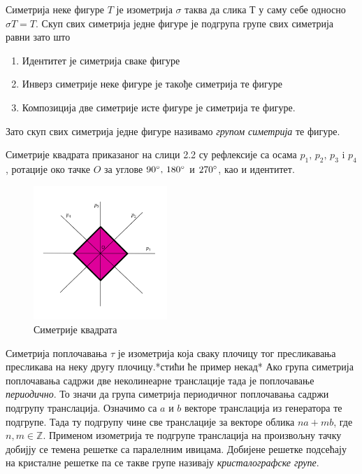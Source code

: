 \documentclass[12pt]{report}
\begin{document}
Симетрија неке фигуре $T$ је изометрија $\sigma$ таква да слика $Т$ у саму себе односно $\sigma T = T$. Скуп свих симетрија једне фигуре је подгрупа групе свих симетрија равни зато што
\begin{enumerate}
    \item Идентитет је симетрија сваке фигуре
    \item Инверз симетрије неке фигуре је такође симетрија те фигуре
    \item Композиција две симетрије исте фигуре је симетрија те фигуре.
\end{enumerate}

Зато скуп свих симетрија једне фигуре називамо \emph{групом симетрија} те фигуре.
\newline



Симетрије квадрата приказаног на слици 2.2 су рефлексије са осама $p_1,\, p_2,\, p_3$ i $p_4$, ротације око тачке $O$ за углове $90\degree,\, 180\degree$ и $ 270\degree$, као и идентитет.
 
 
 
\begin{figure}[H]
\centering
\includegraphics[width=0.45\textwidth]{Simetrije_kocke.png}
\caption{Симетрије квадрата}

\end{figure}





Симетрија поплочавања $\tau$ је изометрија која сваку плочицу тог пресликавања пресликава на неку другу плочицу.*стићи ће пример некад*
Ако група симетрија поплочавања садржи две неколинеарне транслације тада је поплочавање \emph{периодично}. То значи да група симетрија периодичног поплочавања садржи подгрупу транслација. Означимо са $a$ и $b$ векторе транслација из генератора те подгрупе. Тада ту подгрупу чине све транслације за  векторе облика $na + mb$, где $n,m \in \mathbb{Z} $. Применом изометрија те подгрупе транслација на произвољну тачку добијју се темена решетке са паралелним ивицама. Добијене решетке подсећају на кристалне решетке па се такве групе називају \emph{кристалографске групе}.
\end{document}
